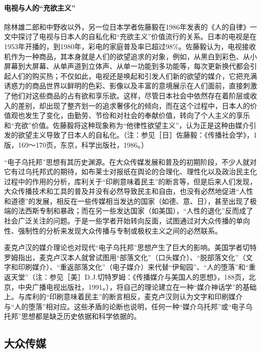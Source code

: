 \documentclass[UTF8,12pt]{ctexart}
\numberwithin{equation}{section} %
\numberwithin{figure}{section}
\numberwithin{table}{section}
\begin{document}
	\paragraph{电视与人的“充欲主义”}
	
	除林雄二郎和中野收以外，另一位日本学者佐藤毅在1986年发表的《人的自律》一文中探讨了电视与日本人的自私化和“充欲主义”价值流行的关系。日本的电视是在1953年开播的，到1980年，彩电的家庭普及率已超过98\%。佐藤毅认为，电视接收机作为一种商品，其本身就是人们的欲望追求的对象，例如，从黑白到彩色、从小屏幕到大屏幕、从单声道到立体声、从单一功能到多功能等，每次更新换代都会引起人们的购买热；不仅如此，电视还是唤起和引发人们新的欲望的媒介，它把充满诱惑力的商品世界以鲜明的色彩、影像以及丰富的意境展示在人们面前，直接刺激了他们对这些商品的占有欲和享乐欲。这样，尽管日本社会中依然存在着阶层或收入的差别，却出现了整齐划一的追求奢侈化的倾向，而在这个过程中，日本人的价值观也发生了变化，由勤劳、节俭和对社会的奉献价值，转向了个人主义的享乐和“充欲”价值。佐藤毅将这种现象称为“他律性欲望主义”，认为正是这种由媒介引发的欲望主义导致了日本人的自私化。（注：参见［日］佐藤毅：《传播社会学》，1版，169～170页，东京，科学出版社，1986。）
	
	
	“电子乌托邦”思想有其历史渊源。在大众传媒发展和普及的初期阶段，不少人就对它有过乌托邦式的期待，如布莱士对报纸在舆论的合理化、理性化以及政治民主化过程中的作用的分析，库利关于“印刷意味着民主”的断言等，但是后来人们发现，大众传播技术和工具的普及并没有必然导致民主和自由，也没有必然地促进“人性和道德”的发展，相反在一些传媒相当发达的国家（如德、意、日），甚至出现了极端的法西斯专制和暴政；而在另一些发达国家（如美国），“人性的退化”反而成了社会广泛关注的问题。于是一些学者开始转向反面，试图通过对大众传播的单向性、强制性的分析来发现大众传播与专制或极权主义之间的必然联系。
	
	麦克卢汉的媒介理论也对现代“电子乌托邦”思想产生了巨大的影响。美国学者切特罗姆指出，麦克卢汉本人就曾试图用“部落文化”（口头媒介）、“脱部落文化”（文字和印刷媒介）、“重返部落文化”（电子媒介）来代替“伊甸园”、“人的堕落”和“重返天堂”（注：参见［美］D.J.切特罗姆：《传播媒介与美国人的思想》，188页，北京，中央广播电视出版社，1991。），将自己的理论建立在一种“媒介神话学”的基础上。与库利的“印刷意味着民主”的断言相反，麦克卢汉则认为文字和印刷媒介与“人的堕落”相对应。这些矛盾的论断也说明，任何一种“媒介乌托邦”或“电子乌托邦”思想都是缺乏历史依据和科学依据的。
	
	\subsection{大众传媒}
	
\end{document}
